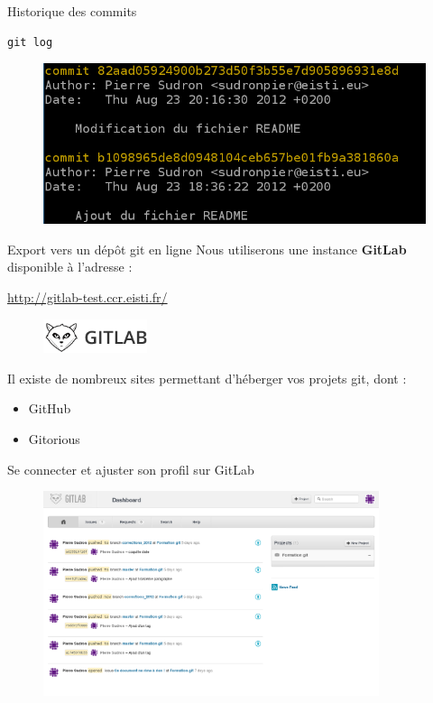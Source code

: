 \documentclass{beamer}
\begin{document}
\begin{frame}[fragile]{Historique des commits}
	\begin{lstlisting}[frame=single]
		git log
	\end{lstlisting}
		
	\begin{figure}
		\centering
		\includegraphics[width=11.5cm]{img/shot4}
	\end{figure}
\end{frame}

\begin{frame}{Export vers un dépôt git en ligne}
	Nous utiliserons une instance \textbf{GitLab} disponible à l'adresse :
	\begin{center}
	\url{http://gitlab-test.ccr.eisti.fr/}
	\end{center}
	\begin{figure}
  		\centering
 		\includegraphics[height=1cm]{img/gitlab-logo}
	\end{figure}
	
	Il existe de nombreux sites permettant d'héberger vos projets git, dont :
	\begin{itemize}
		\item GitHub
		\item Gitorious
	\end{itemize}
\end{frame}

\begin{frame}{Se connecter et ajuster son profil sur GitLab}
	\begin{figure}
  		\centering
 		\includegraphics[height=6cm]{img/shot10}
	\end{figure}
\end{frame}
\end{document}
